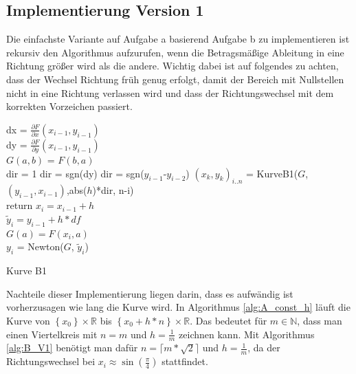 \documentclass[a4paper,11pt,bibliography=totoc,listof=totoc,headinclude=true,cleardoublepage=empty,oneside]{scrartcl}
\newcommand{\diff}[2]{\frac{\partial #1}{\partial #2}}
\begin{document}
\subsection{Implementierung Version 1}
Die einfachste Variante auf Aufgabe a basierend Aufgabe b zu implementieren ist rekursiv den Algorithmus aufzurufen, wenn die Betragsmäßige Ableitung in eine Richtung größer wird als die andere. Wichtig dabei ist auf folgendes zu achten, dass der Wechsel Richtung früh genug erfolgt, damit der Bereich mit Nullstellen nicht in eine Richtung verlassen wird und dass der Richtungswechsel mit dem korrekten Vorzeichen passiert. 
\begin{algorithm}[h]
	\label{alg:B_V1}
	{
		dx = $\diff{F}{x}(x_{i-1},y_{i-1})$\\
		dy = $\diff{F}{y}(x_{i-1},y_{i-1})$\\
		{
			$G(a,b)$ = $F(b,a)$\\
			dir = 1
			{dir = sgn(dy)}
			{dir = sgn($y_{i-1}$-$y_{i-2}$)}
			$(x_k,y_k)_{i..n}$ = KurveB1($G$,$(y_{i-1},x_{i-1})$,abs($h$)*dir, n-i)\\
			return
		}
		{
			$x_i = x_{i-1}+h$\\
			$\tilde y_i = y_{i-1}+h*df$\\
			$G(a) = F(x_i,a)$\\
			$y_i$ = Newton($G$, $\tilde y_i$)
		}
	}
	\caption{Kurve B1}
\end{algorithm}
Nachteile dieser Implementierung liegen darin, dass es aufwändig ist vorherzusagen wie lang die Kurve wird. In Algorithmus \ref{alg:A_const_h} läuft die Kurve von $\left\lbrace x_0\right\rbrace \times\mathbb{R}$ bis $\left\lbrace x_0+h*n\right\rbrace \times\mathbb{R}$. Das bedeutet für $m\in \mathbb{N}$, dass man einen Viertelkreis mit $n=m$ und $h=\frac{1}{m}$ zeichnen kann. Mit Algorithmus \ref{alg:B_V1} benötigt man dafür $n=\lceil m*\sqrt{2}\rceil$ und $h=\frac{1}{m}$, da der Richtungswechsel bei $x_i\approx \sin(\frac{\pi}{4})$ stattfindet.
\end{document}
